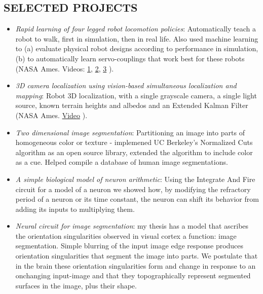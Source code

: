 \documentclass[conference,lettersize,twocolumn,twosize]{./IEEEtran}
\begin{document}
\subsection*{SELECTED PROJECTS}
\begin{center}
  \begin{itemize}
  \item{\emph{Rapid learning of four legged robot locomotion
      policies}: Automatically teach a robot to walk, first in
    simulation, then in real life. Also used machine learning to (a)
    evaluate physical robot designs according to performance in
    simulation, (b) to automatically learn servo-couplings that work
    best for these robots (NASA Ames. Videos:
    \href{https://www.youtube.com/watch?v=nOca5QXBuTQ}{1},
    \href{https://www.youtube.com/watch?v=\_Dw67QpAlhU}{2}, 
    \href{https://www.youtube.com/watch?v=rp31BvijiqU}{3}
    ).}
  \item{\emph{3D camera localization using vision-based simultaneous
    localization and mapping}: Robot 3D localization, with a single
    grayscale camera, a single light source, known terrain heights and
    albedos and an Extended Kalman Filter (NASA Ames.
    \href{https://www.youtube.com/watch?v=zmq\_9Zw\_Awo)}{Video}
    ).}
  \item{\emph{Two dimensional image segmentation}: Partitioning an
    image into parts of homogeneous color or texture - implemened UC
    Berkeley's Normalized Cuts algorithm as an open source library,
    extended the algorithm to include color as a cue. Helped compile a
    database of human image segmentations.}
  \item{\emph{A simple biological model of neuron arithmetic}: Using
    the Integrate And Fire circuit for a model of a neuron we showed
    how, by modifying the refractory period of a neuron or its time
    constant, the neuron can shift its behavior from adding its inputs
    to multiplying them.}
  \item{\emph{Neural circuit for image segmentation}:
    my thesis has a model that ascribes the orientation singularities
    observed in visual cortex a function: image segmentation. Simple
    blurring of the input image edge response produces orientation
    singularities that segment the image into parts. We postulate that
    in the brain these orientation singularities form and change in
    response to an onchanging input-image and that they
    topographically represent segmented surfaces in the image, plus
    their shape.}
  \end{itemize}
\end{center}
\end{document}
